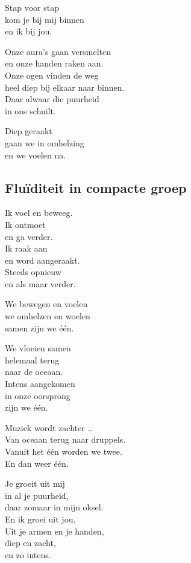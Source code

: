 \documentclass[
  11pt,
]{book}
\begin{document}
Stap voor stap\\
kom je bij mij binnen\\
en ik bij jou.

Onze aura's gaan versmelten\\
en onze handen raken aan.\\
Onze ogen vinden de weg\\
heel diep bij elkaar naar binnen.\\
Daar alwaar die puurheid\\
in ons schuilt.

Diep geraakt\\
gaan we in omhelzing\\
en we voelen na.

\hypertarget{fluuxefditeit-in-compacte-groep}{%
\subsection*{Fluïditeit in compacte groep}\label{fluuxefditeit-in-compacte-groep}}

Ik voel en beweeg.\\
Ik ontmoet\\
en ga verder.\\
Ik raak aan\\
en word aangeraakt.\\
Steeds opnieuw\\
en als maar verder.

We bewegen en voelen\\
we omhelzen en woelen\\
samen zijn we één.

We vloeien samen\\
helemaal terug\\
naar de oceaan.\\
Intens aangekomen\\
in onze oorsprong\\
zijn we één.

Muziek wordt zachter \ldots{}\\
Van oceaan terug naar druppels.\\
Vanuit het één worden we twee.\\
En dan weer één.

Je groeit uit mij\\
in al je puurheid,\\
daar zomaar in mijn oksel.\\
En ik groei uit jou.\\
Uit je armen en je handen,\\
diep en zacht,\\
en zo intens.
\end{document}
